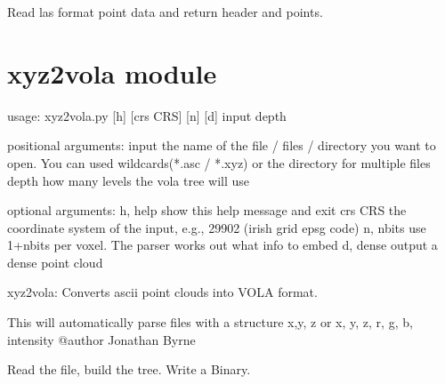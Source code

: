 \documentclass[letterpaper,10pt,english]{sphinxmanual}
\begin{document}

\begin{fulllineitems}
\label{\detokenize{las2vola:las2vola.parse_las}}
Read las format point data and return header and points.

\end{fulllineitems}



\section{xyz2vola module}
\label{\detokenize{xyz2vola:xyz2vola-module}}\label{\detokenize{xyz2vola::doc}}
\begin{sphinxVerbatim}[commandchars=\\\{\}]
usage: xyz2vola.py [\PYGZhy{}h] [\PYGZhy{}\PYGZhy{}crs CRS] [\PYGZhy{}n] [\PYGZhy{}d] input depth

positional arguments:
  input        the name of the file / files / directory you want to open. You
               can used wildcards(*.asc / *.xyz) or the directory for multiple
               files
  depth        how many levels the vola tree will use

optional arguments:
  \PYGZhy{}h, \PYGZhy{}\PYGZhy{}help   show this help message and exit
  \PYGZhy{}\PYGZhy{}crs CRS    the coordinate system of the input, e.g., 29902 (irish grid
               epsg code)
  \PYGZhy{}n, \PYGZhy{}\PYGZhy{}nbits  use 1+nbits per voxel. The parser works out what info to embed
  \PYGZhy{}d, \PYGZhy{}\PYGZhy{}dense  output a dense point cloud
\end{sphinxVerbatim}
\label{\detokenize{xyz2vola:module-xyz2vola}}
xyz2vola: Converts ascii point clouds into VOLA format.

This will automatically parse files with a structure x,y, z or
x, y, z, r, g, b, intensity
@author Jonathan Byrne

\begin{fulllineitems}
\label{\detokenize{xyz2vola:xyz2vola.main}}
Read the file, build the tree. Write a Binary.

\end{fulllineitems}

\end{document}
